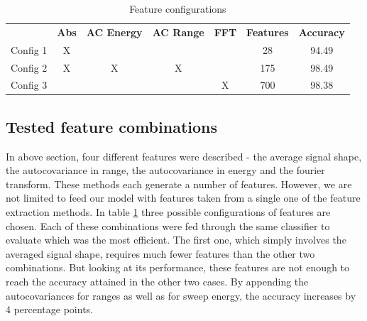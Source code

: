 

\begin{table}
\label{tab:feat}
\begin{center}
  \begin{tabular}{|c|cccccc|}
\hline
    \rowcolor{gray!150}
		  & \color{white}\textbf{Abs} & \color{white}\textbf{AC Energy} & \color{white}\textbf{AC Range} & \color{white}\textbf{FFT} & \color{white}\textbf{Features} & \color{white}\textbf{Accuracy} \\
	  Config 1 & X &   &   &   & 28  & 94.49 \\
	  Config 2 & X & X & X & & 175 & 98.49 \\
	  Config 3 & & & & X & 700 & 98.38 \\
\hline
  \end{tabular}
\end{center}
\caption{Feature configurations}
\end{table}


\subsection{Tested feature combinations}

In above section, four different features were described - the average signal shape, the autocovariance in range, the autocovariance in energy and the fourier transform. These methods each generate a number of features. However, we are not limited to feed our model with features taken from a single one of the feature extraction methods. In table \ref{tab:feat} three possible configurations of features are chosen. Each of these combinations were fed through the same classifier to evaluate which was the most efficient. The first one, which simply involves the averaged signal shape, requires much fewer features than the other two combinations. But looking at its performance, these features are not enough to reach the accuracy attained in the other two cases. By appending the autocovariances for ranges as well as for sweep energy, the accuracy increases by 4 percentage points. 

